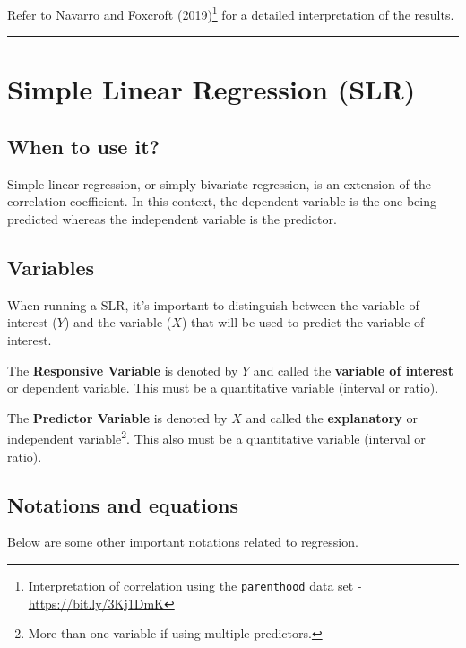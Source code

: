 \documentclass[
]{article}
\begin{document}
Refer to Navarro and Foxcroft (2019)\footnote{Interpretation of correlation using the \texttt{parenthood} data set - \url{https://bit.ly/3Kj1DmK}} for a detailed interpretation of the results.

\begin{center}\rule{0.5\linewidth}{0.5pt}\end{center}

\hypertarget{simple-linear-regression-slr}{%
\section{Simple Linear Regression (SLR)}\label{simple-linear-regression-slr}}

\hypertarget{when-to-use-it-1}{%
\subsection{When to use it?}\label{when-to-use-it-1}}

Simple linear regression, or simply bivariate regression, is an extension of the correlation coefficient. In this context, the dependent variable is the one being predicted whereas the independent variable is the predictor.

\hypertarget{variables}{%
\subsection{Variables}\label{variables}}

When running a SLR, it's important to distinguish between the variable of interest (\(Y\)) and the variable (\(X\)) that will be used to predict the variable of interest.

The \textbf{Responsive Variable} is denoted by \(Y\) and called the \textbf{variable of interest} or dependent variable. This must be a quantitative variable (interval or ratio).

The \textbf{Predictor Variable} is denoted by \(X\) and called the \textbf{explanatory} or independent variable\footnote{More than one variable if using multiple predictors.}. This also must be a quantitative variable (interval or ratio).

\hypertarget{notations-and-equations}{%
\subsection{Notations and equations}\label{notations-and-equations}}

Below are some other important notations related to regression.
\end{document}
